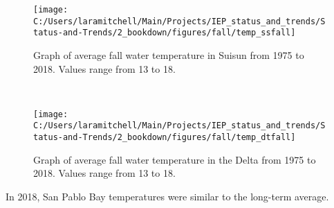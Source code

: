 \documentclass[
]{book}
\begin{document}
\begin{panel-grid}
\begin{columns-nocenter}
\begin{column40}
\end{column40}

\begin{column800}

\begin{expand}

\begin{figure}
\texttt{[image: C:/Users/laramitchell/Main/Projects/IEP\_status\_and\_trends/Status-and-Trends/2\_bookdown/figures/fall/temp\_ssfall]} \caption{Graph of average fall water temperature in Suisun from 1975 to 2018. Values range from 13 to 18.}\label{fig:unnamed-chunk-103}
\end{figure}

\end{expand}

\end{column800}

\begin{column40}

~

\end{column40}

\begin{column800}

\begin{expand}

\begin{figure}
\texttt{[image: C:/Users/laramitchell/Main/Projects/IEP\_status\_and\_trends/Status-and-Trends/2\_bookdown/figures/fall/temp\_dtfall]} \caption{Graph of average fall water temperature in the Delta from 1975 to 2018. Values range from 13 to 18.}\label{fig:unnamed-chunk-104}
\end{figure}

\end{expand}

\end{column800}

\end{columns-nocenter}

\begin{columns-nocenter}

\begin{column800}

In 2018, San Pablo Bay temperatures were similar to the long-term average.

\end{column800}

\begin{column40}

~


\end{column40}
\end{columns-nocenter}
\end{panel-grid}
\end{document}
